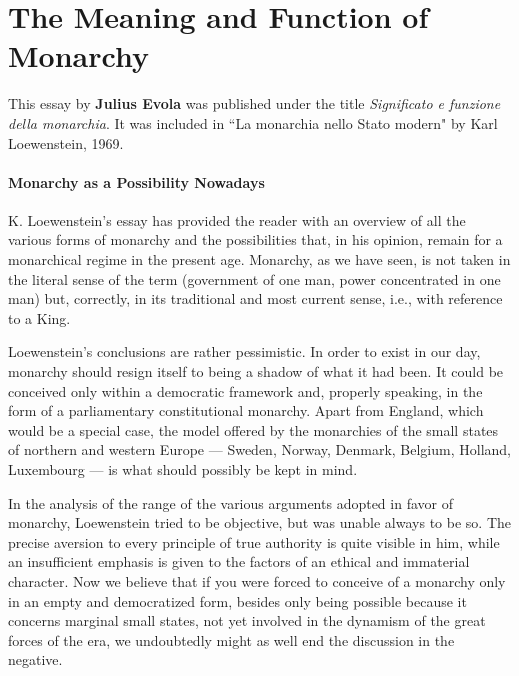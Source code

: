 \section{The Meaning and Function of Monarchy}

\begin{quotex}
This essay by \textbf{Julius Evola} was published under the title \textit{Significato e funzione della monarchia}. It was included in ``La monarchia nello Stato modern" by Karl Loewenstein, 1969.
\end{quotex}

\paragraph{Monarchy as a Possibility Nowadays} K. Loewenstein's essay has provided the reader with an overview of all the various forms of monarchy and the possibilities that, in his opinion, remain for a monarchical regime in the present age. Monarchy, as we have seen, is not taken in the literal sense of the term (government of one man, power concentrated in one man) but, correctly, in its traditional and most current sense, i.e., with reference to a King.

Loewenstein's conclusions are rather pessimistic. In order to exist in our day, monarchy should resign itself to being a shadow of what it had been. It could be conceived only within a democratic framework and, properly speaking, in the form of a parliamentary constitutional monarchy. Apart from England, which would be a special case, the model offered by the monarchies of the small states of northern and western Europe — Sweden, Norway, Denmark, Belgium, Holland, Luxembourg — is what should possibly be kept in mind.

In the analysis of the range of the various arguments adopted in favor of monarchy, Loewenstein tried to be objective, but was unable always to be so. The precise aversion to every principle of true authority is quite visible in him, while an insufficient emphasis is given to the factors of an ethical and immaterial character. Now we believe that if you were forced to conceive of a monarchy only in an empty and democratized form, besides only being possible because it concerns marginal small states, not yet involved in the dynamism of the great forces of the era, we undoubtedly might as well end the discussion in the negative.

